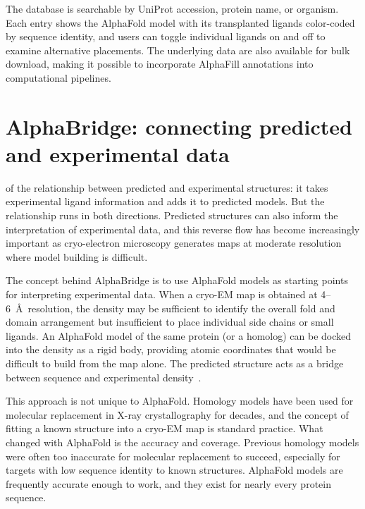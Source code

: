 The database is searchable by UniProt accession, protein name, or organism. Each entry shows the AlphaFold model with its transplanted ligands color-coded by sequence identity, and users can toggle individual ligands on and off to examine alternative placements. The underlying data are also available for bulk download, making it possible to incorporate AlphaFill annotations into computational pipelines.


\section{AlphaBridge: connecting predicted and experimental data}
\label{sec:alphabridge}

 of the relationship between predicted and experimental structures: it takes experimental ligand information and adds it to predicted models. But the relationship runs in both directions. Predicted structures can also inform the interpretation of experimental data, and this reverse flow has become increasingly important as cryo-electron microscopy generates maps at moderate resolution where model building is difficult.

The concept behind AlphaBridge is to use AlphaFold models as starting points for interpreting experimental data. When a cryo-EM map is obtained at 4--6~\AA\ resolution, the density may be sufficient to identify the overall fold and domain arrangement but insufficient to place individual side chains or small ligands. An AlphaFold model of the same protein (or a homolog) can be docked into the density as a rigid body, providing atomic coordinates that would be difficult to build from the map alone. The predicted structure acts as a bridge between sequence and experimental density~\cite{liebschner2019}.

This approach is not unique to AlphaFold. Homology models have been used for molecular replacement in X-ray crystallography for decades, and the concept of fitting a known structure into a cryo-EM map is standard practice. What changed with AlphaFold is the accuracy and coverage. Previous homology models were often too inaccurate for molecular replacement to succeed, especially for targets with low sequence identity to known structures. AlphaFold models are frequently accurate enough to work, and they exist for nearly every protein sequence.

